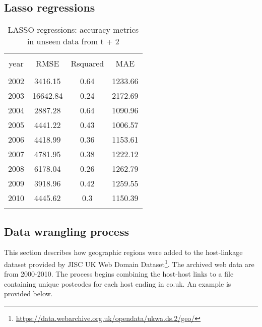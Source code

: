 \documentclass[
]{article}
\begin{document}
\hypertarget{lasso-regressions}{%
\subsection{Lasso regressions}\label{lasso-regressions}}

\begin{table}[!htbp] \centering 
  \caption{LASSO regressions: accuracy metrics in unseen data from t + 2\label{accuracy_test}} 
  \label{} 
\footnotesize 
\begin{tabular}{@{\extracolsep{0pt}} cccc} 
\\[-1.8ex]\hline 
\hline \\[-1.8ex] 
year & RMSE & Rsquared & MAE \\ 
\hline \\[-1.8ex] 
2002 & 3416.15 & 0.64 & 1233.66 \\ 
2003 & 16642.84 & 0.24 & 2172.69 \\ 
2004 & 2887.28 & 0.64 & 1090.96 \\ 
2005 & 4441.22 & 0.43 & 1006.57 \\ 
2006 & 4418.99 & 0.36 & 1153.61 \\ 
2007 & 4781.95 & 0.38 & 1222.12 \\ 
2008 & 6178.04 & 0.26 & 1262.79 \\ 
2009 & 3918.96 & 0.42 & 1259.55 \\ 
2010 & 4445.62 & 0.3 & 1150.39 \\ 
\hline \\[-1.8ex] 
\end{tabular} 
\end{table}

\hypertarget{data-wrangling-process}{%
\subsection{Data wrangling process}\label{data-wrangling-process}}

This section describes how geographic regions were added to the
host-linkage dataset provided by JISC UK Web Domain Dataset\footnote{\url{https://data.webarchive.org.uk/opendata/ukwa.ds.2/geo/}}.
The archived web data are from 2000-2010. The process begins combining
the host-host links to a file containing unique postcodes for each host
ending in co.uk. An example is provided below.
\end{document}
